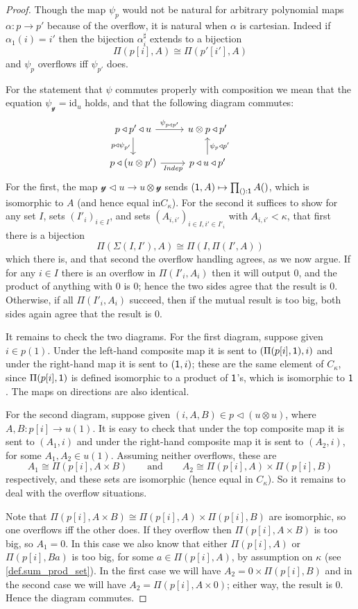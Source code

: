 \documentclass[11pt, one side, article]{memoir}
\theoremstyle{definition}
\theoremstyle{plain}
\newcommand{\Fun}[1]{\mathit{#1}}%
\newcommand{\id}{\mathrm{id}}
\newcommand{\yon}{\mathcal{y}}
\newcommand{\0}{\textsf{0}}
\newcommand{\1}{\tn{\textsf{1}}}
\newcommand{\tri}{\mathbin{\triangleleft}}
\newcommand{\indep}{\Fun{Indep}}
\newcommand{\qqand}{\qquad\text{and}\qquad}
\begin{document}
\begin{proof}
Though the map $\psi_{p}$ would not be natural for arbitrary polynomial maps $\alpha\colon p\to p'$ because of the overflow, it is natural when $\alpha$ is cartesian. Indeed if $\alpha_1(i)=i'$ then the bijection $\alpha_i^\sharp$ extends to a bijection
\[\Pi(p[i],A)\cong\Pi(p'[i'],A)\]
and $\psi_p$ overflows iff $\psi_{p'}$ does.

For the statement that $\psi$ commutes properly with composition we mean that the equation $\psi_{\yon}=\id_{u}$ holds, and that the following diagram commutes:
\[
\begin{tikzcd}
	p\tri p'\tri u\ar[d, "p\tri\psi_{p'}"']\ar[r, "\psi_{p\tri p'}"]&
	u\otimes p\tri p'\\
	p\tri (u\otimes p')\ar[r, "\indep"']&
	p\tri u\tri p'\ar[u, "\psi_{p}\tri p'"']&
\end{tikzcd}
\]
For the first, the map $\yon\tri u\to u\otimes\yon$ sends $(\1,A)\mapsto\prod_{():\1}A()$, which is isomorphic to $A$ (and hence equal in$C_\kappa$). For the second it suffices to show for any set $I$, sets $(I'_i)_{i\in I}$, and sets $(A_{i,i'})_{i\in I, i'\in I'_i}$ with $A_{i,i'}<\kappa$, that first there is a bijection
\[\Pi(\Sigma(I,I'),A)\cong\Pi(I,\Pi(I',A))\]
which there is, and that second the overflow handling agrees, as we now argue. If for any $i\in I$ there is an overflow in $\Pi(I'_i,A_i)$ then it will output $0$, and the product of anything with $0$ is $0$; hence the two sides agree that the result is $0$. Otherwise, if all $\Pi(I'_i,A_i)$ succeed, then if the mutual result is too big, both sides again agree that the result is $0$.

It remains to check the two diagrams. For the first diagram, suppose given $i\in p(1)$. Under the left-hand composite map it is sent to $(\Pi(p[i],\1),i)$ and under the right-hand map it is sent to $(\1,i)$; these are the same element of $C_\kappa$, since $\Pi(p[i],\1)$ is defined isomorphic to a product of $\1$'s, which is isomorphic to $\1$. The maps on directions are also identical.

For the second diagram, suppose given $(i,A,B)\in p\tri(u\otimes u)$, where $A,B\colon p[i]\to u(1)$. It is easy to check that under the top composite map it is sent to  $(A_1,i)$ and under the right-hand composite map it is sent to $(A_2,i)$, for some $A_1,A_2\in u(1)$. Assuming neither overflows, these are 
\[
  A_1\cong\Pi(p[i],A\times B)
  \qqand
	A_2\cong\Pi(p[i],A)\times\Pi(p[i],B)
\] 
respectively, and these sets are isomorphic (hence equal in $C_\kappa$). So it remains to deal with the overflow situations.

Note that $\Pi(p[i],A\times B)\cong\Pi(p[i],A)\times\Pi(p[i],B)$ are isomorphic, so one overflows iff the other does. If they overflow then $\Pi(p[i],A\times B)$ is too big, so $A_1=0$. In this case we also know that either $\Pi(p[i],A)$ or $\Pi(p[i],Ba)$ is too big, for some $a\in\Pi(p[i],A)$, by assumption on $\kappa$ (see \cref{def.sum_prod_set}). In the first case we will have $A_2=0\times\Pi(p[i],B)$ and in the second case we will have $A_2=\Pi(p[i],A\times 0)$; either way, the result is $0$. Hence the diagram commutes.
\end{proof}
\end{document}
